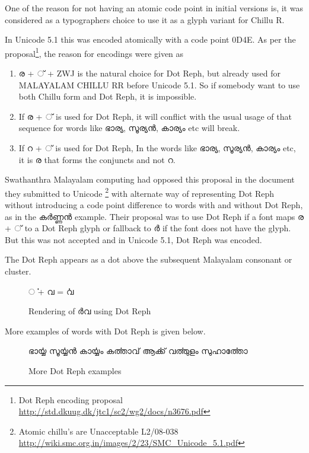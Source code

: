 One of the reason for not having an atomic code point in initial versions is,
it was considered as a typographers choice to use it as a glyph variant for Chillu R.

In Unicode 5.1 this was encoded atomically with a code point 0D4E.
As per the proposal\footnote{ Dot Reph encoding proposal \url{http://std.dkuug.dk/jtc1/sc2/wg2/docs/n3676.pdf}},
the reason for encodings were given as

\begin{enumerate}
\item  {\malayalam ര + ് + ZWJ} is the natural choice for Dot Reph, but already used
for MALAYALAM CHILLU RR before Unicode 5.1. So if somebody want to use both
Chillu form and Dot Reph, it is impossible.
\item If {\malayalam ര + ് } is used for Dot Reph, it will conflict with the usual
usage of that sequence for words like {\malayalam ഭാര്യ, സൂര്യന്‍, കാര്യം } etc will break.
\item If {\malayalam റ + ് } is used for Dot Reph, In the words like
{\malayalam ഭാര്യ, സൂര്യന്‍, കാര്യം } etc, it is ര  that forms the conjuncts and not  {\malayalam റ}.
\end{enumerate}

Swathanthra Malayalam computing had opposed this proposal in the document they
submitted to Unicode \footnote{Atomic chillu's are Unacceptable L2/08-038 \url{http://wiki.smc.org.in/images/2/23/SMC_Unicode_5.1.pdf}}
with alternate way of representing Dot Reph without introducing a code point
difference to words with and without Dot Reph, as in the {\malayalam കര്‍ണ്ണന്‍}
example. Their proposal was to use Dot Reph if a font maps {\malayalam ര + ്  }
to a Dot Reph glyph or fallback to {\malayalam ര്‍} if the font does not have
the glyph. But this was not accepted and in Unicode 5.1, Dot Reph was encoded.

The Dot Reph appears as a dot above the subsequent Malayalam consonant or cluster.

\begin{figure}[h!]
  \centering
  {\meera\textexample ൎ + വ  = ൎവ }\\
  \caption{Rendering of {\malayalam ര്‍വ } using Dot Reph }
\end{figure}

More examples of words with Dot Reph is given below.

\begin{figure}[h!]
  \centering
  {\meera ഭാൎയ്യ സൂൎയ്യന്‍ കാൎയ്യം  കൎത്താവ്  ആൎക്ക്  വൎത്തുളം  സുഹാൎത്തോ}\\
  \caption{More Dot Reph examples}
\end{figure}

